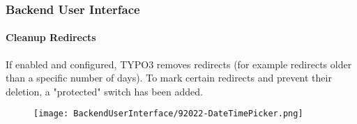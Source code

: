 %

\begin{frame}[fragile]
	\frametitle{Backend User Interface}
	\framesubtitle{Cleanup Redirects}

	If enabled and configured, TYPO3 removes redirects (for example redirects
	older than a specific number of days).
	To mark certain redirects and prevent their deletion, a "protected" switch
	has been added.

	\begin{figure}
		\texttt{[image: BackendUserInterface/92022-DateTimePicker.png]}
	\end{figure}

\end{frame}


